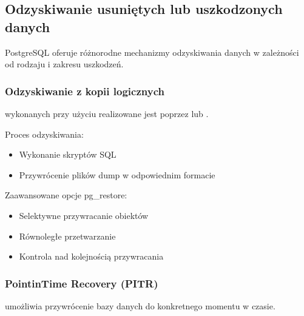 \documentclass[letterpaper,10pt,polish]{sphinxmanual}
\begin{document}
\subsection{Odzyskiwanie usuniętych lub uszkodzonych danych}
\label{\detokenize{rozdzial2/Kopie_zapasowe_i_odzyskiwanie_danych/kopie_zapasowe_i_odzyskiwanie_danych:odzyskiwanie-usunietych-lub-uszkodzonych-danych}}
\sphinxAtStartPar
PostgreSQL oferuje różnorodne mechanizmy odzyskiwania danych w zależności od rodzaju i zakresu uszkodzeń.


\subsubsection{Odzyskiwanie z kopii logicznych}
\label{\detokenize{rozdzial2/Kopie_zapasowe_i_odzyskiwanie_danych/kopie_zapasowe_i_odzyskiwanie_danych:odzyskiwanie-z-kopii-logicznych}}
\sphinxAtStartPar
{} wykonanych przy użyciu  realizowane jest poprzez  lub .

\sphinxAtStartPar
Proces odzyskiwania:
\begin{itemize}
\item {} 
\sphinxAtStartPar
Wykonanie skryptów SQL

\item {} 
\sphinxAtStartPar
Przywrócenie plików dump w odpowiednim formacie

\end{itemize}

\sphinxAtStartPar
Zaawansowane opcje pg\_restore:
\begin{itemize}
\item {} 
\sphinxAtStartPar
Selektywne przywracanie obiektów

\item {} 
\sphinxAtStartPar
Równoległe przetwarzanie

\item {} 
\sphinxAtStartPar
Kontrola nad kolejnością przywracania

\end{itemize}


\subsubsection{Point\sphinxhyphen{}in\sphinxhyphen{}Time Recovery (PITR)}
\label{\detokenize{rozdzial2/Kopie_zapasowe_i_odzyskiwanie_danych/kopie_zapasowe_i_odzyskiwanie_danych:point-in-time-recovery-pitr}}
\sphinxAtStartPar
{} umożliwia przywrócenie bazy danych do konkretnego momentu w czasie.
\end{document}
